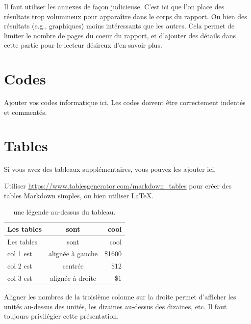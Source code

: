 \documentclass[mstat,12pt]{unswthesis}
\begin{document}
Il faut utiliser les annexes de façon judicieuse. C'est ici que l'on
place des résultats trop volumineux pour apparaître dans le corps du
rapport. Ou bien des résultats (e.g., graphiques) moins intéressants que
les autres. Cela permet de limiter le nombre de pages du coeur du
rapport, et d'ajouter des détails dans cette partie pour le lecteur
désireux d'en savoir plus.

\section*{\texorpdfstring{\textbf{Codes}}{Codes}}\label{codes}

Ajouter vos codes informatique ici. Les codes doivent être correctement
indentés et commentés.

\section*{\texorpdfstring{\textbf{Tables}}{Tables}}\label{tables}

Si vous avez des tableaux supplémentaires, vous pouvez les ajouter ici.

Utiliser \url{https://www.tablesgenerator.com/markdown_tables} pour
créer des tables Markdown simples, ou bien utiliser \LaTeX.

\begin{longtable}[]{@{}lcr@{}}
\caption{une légende au-dessus du tableau.
\label{tab7.1}}\tabularnewline
\toprule\noalign{}
Les tables & sont & cool \\
\midrule\noalign{}
\endfirsthead
\toprule\noalign{}
Les tables & sont & cool \\
\midrule\noalign{}
\endhead
\bottomrule\noalign{}
\endlastfoot
col 1 est & alignée à gauche & \$1600 \\
col 2 est & centrée & \$12 \\
col 3 est & alignée à droite & \$1 \\
\end{longtable}

Aligner les nombres de la troisième colonne sur la droite permet
d'afficher les unités au-dessus des unités, les dizaines au-dessus des
dizaines, etc. Il faut toujours privilégier cette présentation.
\end{document}
